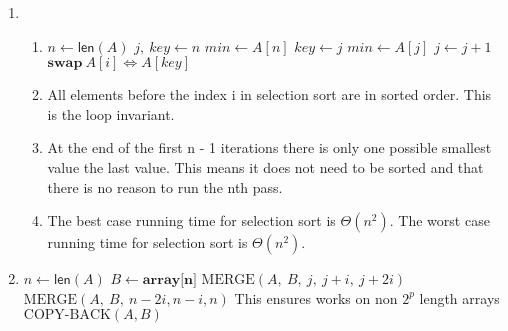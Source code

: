 \documentclass{article}
\DeclarePairedDelimiter{\ceil}{\lceil}{\rceil}
\begin{document}
\begin{enumerate}
\item
  \begin{enumerate}
    \item
      \begin{algorithmic}[0]
          \State $n \gets \mathsf{len}(A)$
            \State $j, \: key \gets n$
            \State $min \gets A[n]$
                \State $key \gets j$
                \State $min \gets A[j]$
              \EndIf
              \State $j \gets j + 1$
            \EndWhile
            \State $\textbf{swap} \: A[i] \Leftrightarrow A[key]$
          \EndFor
        \EndFunction
      \end{algorithmic}
    \item
      All elements before the index i in selection sort are in sorted order. This is the loop invariant.
    \item
      At the end of the first n - 1 iterations there is only one possible smallest value the last value.
      This means it does not need to be sorted and that there is no reason to run the nth pass. 
    \item
      The best case running time for selection sort is $\Theta(n^2)$.
      The worst case running time for selection sort is $\Theta(n^2)$.
  \end{enumerate}

\item
  \begin{algorithmic}[0]
        \State $n \gets \mathsf{len}(A)$
        \State $B \gets \textbf{array[n]}$
            \State $\text{MERGE}(A, \: B, \: j, \: j + i, \: j + 2i)$
          \EndFor
          \State $\text{MERGE}(A, \: B, \: n - 2i, n - i, n)$
          \Comment This ensures  works on non $2^p$ length arrays
          \State $\text{COPY-BACK}(A, B)$
        \EndFor
      \EndFunction
  \end{algorithmic}
\end{enumerate}
\end{document}
